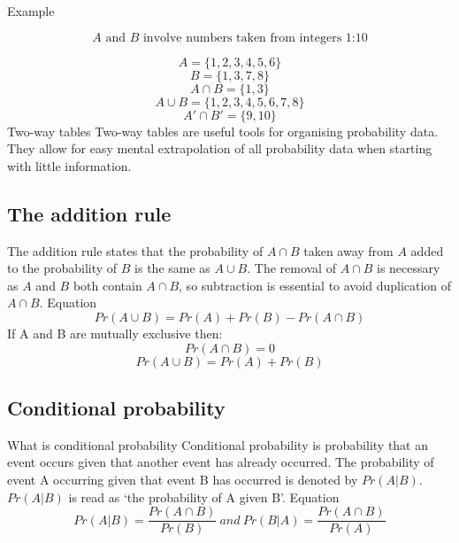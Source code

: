 \begin{outline}
			\3 Example
\begin{center}
				\[\text{$A$ and $B$ involve numbers taken from integers 1:10}\]
\end{center}
				\[A = \{1,2,3,4,5,6\}\]
				\[B = \{1,3,7,8\}\]
				\[A \cap B = \{1,3\}\]
				\[A \cup B = \{1,2,3,4,5,6,7,8\}\]
				\[A' \cap B' = \{9,10\}\]
	\1 Two-way tables
		\2 Two-way tables are useful tools for organising probability data. They allow for easy mental extrapolation of all probability data when starting with little information.
\begin{center}
\end{center}	

\0
\subsection{The addition rule}
	\1 The addition rule states that the probability of $A \cap B$ taken away from $A$ added to the probability of $B$ is the same as $A \cup B$. The removal of $A \cap B$ is necessary as $A$ and $B$ both contain $A \cap B$, so subtraction is essential to avoid duplication of $A \cap B$.
	\1 Equation
		\[Pr(A \cup B) = Pr(A) + Pr(B) - Pr(A \cap B)\]
	\1 If A and B are mutually exclusive then:
		\[Pr(A \cap B) = 0\]
		\[Pr(A \cup B) = Pr(A) + Pr(B)\]

\0
\subsection{Conditional probability}
	\1 What is conditional probability
		\2 Conditional probability is probability that an event occurs given that another event has already occurred. The probability of event A occurring given that event B has occurred is denoted by $Pr(A|B)$. $Pr(A|B)$ is read as `the probability of A given B'.
			\3 Equation
				\[Pr(A|B) = \frac{Pr(A \cap B)}{Pr(B)}\ and\ Pr(B|A) = \frac{Pr(A \cap B)}{Pr(A)}\]


\end{outline}
